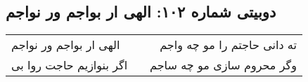 \begin{center}
\section*{دوبیتی شماره ۱۰۲: الهی ار بواجم ور نواجم}
\label{sec:102}
\begin{longtable}{l p{0.5cm} r}
الهی ار بواجم ور نواجم
&&
ته دانی حاجتم را مو چه واجم
\\
اگر بنوازیم حاجت روا بی
&&
وگر محروم سازی مو چه ساجم
\\
\end{longtable}
\end{center}
